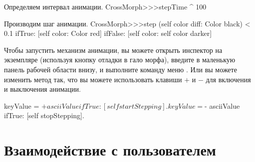 \documentclass[a4paper,10pt,twoside]{book}
\begin{document}
\begin{method}{Определяем интервал анимации.}
CrossMorph>>>stepTime
	^ 100
\end{method}
\begin{method}{Производим шаг анимации.}
CrossMorph>>>step
	(self color diff: Color black) < 0.1
		ifTrue: [self color: Color red]
		ifFalse: [self color: self color darker]
\end{method}
\noindent
Чтобы запустить механизм анимации, вы можете открыть инспектор на экземпляре  (используя кнопку отладки \debugHandle{} в гало морфа), введите  в маленькую панель рабочей области внизу, и выполните команду меню .
Или вы можете изменить метод  так, что вы можете использовать клавиши $+$ и $-$ для включения и выключения анимации.


\begin{code}{}
	keyValue = $+ asciiValue 
		ifTrue: [self startStepping].
	keyValue = $- asciiValue
		ifTrue: [self stopStepping].
\end{code}


\section{Взаимодействие с пользователем}
\end{document}
